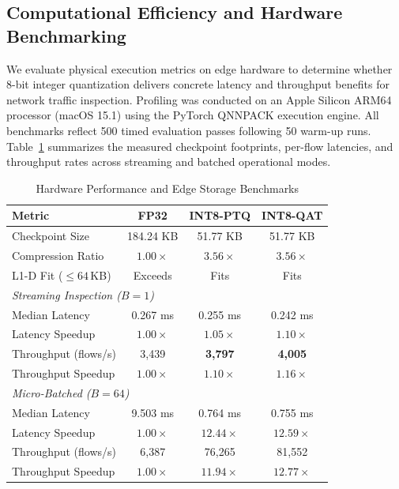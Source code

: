 \documentclass[conference]{IEEEtran}
\begin{document}
\subsection{Computational Efficiency and Hardware Benchmarking}

We evaluate physical execution metrics on edge hardware to determine whether 8-bit integer quantization delivers concrete latency and throughput benefits for network traffic inspection. Profiling was conducted on an Apple Silicon ARM64 processor (macOS 15.1) using the PyTorch QNNPACK execution engine. All benchmarks reflect 500 timed evaluation passes following 50 warm-up runs. Table~\ref{tab:hardware} summarizes the measured checkpoint footprints, per-flow latencies, and throughput rates across streaming and batched operational modes.

\begin{table}[htbp]
\caption{Hardware Performance and Edge Storage Benchmarks}
\label{tab:hardware}
\centering
\footnotesize
\setlength{\tabcolsep}{3pt}
\begin{tabular}{lccc}
\toprule
\textbf{Metric} & \textbf{FP32} & \textbf{INT8-PTQ} & \textbf{INT8-QAT} \\
\midrule
Checkpoint Size & 184.24 KB & 51.77 KB & 51.77 KB \\
Compression Ratio & $1.00\times$ & $\mathbf{3.56\times}$ & $\mathbf{3.56\times}$ \\
L1-D Fit ($\le 64\,$KB) & Exceeds & Fits & Fits \\
\midrule
\multicolumn{4}{l}{\textit{Streaming Inspection ($B = 1$)}} \\
Median Latency & 0.267 ms & 0.255 ms & 0.242 ms \\
Latency Speedup & $1.00\times$ & $1.05\times$ & $1.10\times$ \\
Throughput (flows/s) & 3,439 & \textbf{3,797} & \textbf{4,005} \\
Throughput Speedup & $1.00\times$ & $\mathbf{1.10\times}$ & $\mathbf{1.16\times}$ \\
\midrule
\multicolumn{4}{l}{\textit{Micro-Batched ($B = 64$)}} \\
Median Latency & 9.503 ms & 0.764 ms & 0.755 ms \\
Latency Speedup & $1.00\times$ & $\mathbf{12.44\times}$ & $\mathbf{12.59\times}$ \\
Throughput (flows/s) & 6,387 & 76,265 & 81,552 \\
Throughput Speedup & $1.00\times$ & $\mathbf{11.94\times}$ & $\mathbf{12.77\times}$ \\
\bottomrule
\end{tabular}
\end{table}
\end{document}

